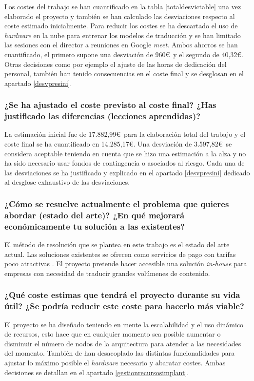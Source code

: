 Los costes del trabajo se han cuantificado en la tabla \ref{totaldesvictable} una vez elaborado el proyecto y también se han calculado las desviaciones respecto al coste estimado inicialmente. Para reducir los costes se ha descartado el uso de \textit{hardware} en la nube para entrenar los modelos de traducción y se han limitado las sesiones con el director a reuniones en Google \textit{meet}. Ambos ahorros se han cuantificado, el primero supone una desviación de 960\euro\ y el segundo de 40,32\euro. Otras decisiones como por ejemplo el ajuste de las horas de dedicación del personal, también han tenido consecuencias en el coste final y se desglosan en el apartado \ref{desvpresini}.

\subsubsection{¿Se ha ajustado el coste previsto al coste final? ¿Has justificado las diferencias (lecciones aprendidas)?}
La estimación inicial fue de 17.882,99\euro\ para la elaboración total del trabajo y el coste final se ha cuantificado en 14.285,17\euro. Una desviación de 3.597,82\euro\ se considera aceptable teniendo en cuenta que se hizo una estimación a la alza y no ha sido necesario usar fondos de contingencia o asociados al riesgo. Cada una de las desviaciones se ha justificado y explicado en el apartado \ref{desvpresini} dedicado al desglose exhaustivo de las desviaciones.

\subsubsection{¿Cómo se resuelve actualmente el problema que quieres abordar (estado del arte)?
¿En qué mejorará económicamente tu solución a las existentes?}

El método de resolución que se plantea en este trabajo es el estado del arte actual.
Las soluciones existentes se ofrecen como servicios de pago con tarifas poco atractivas
\cite{GoogleTranslatePricing,AWSTranslatePricing,MicrosoftTranslatePricing}. El proyecto pretende
hacer accesible una solución \textit{in-house} para empresas con necesidad de traducir grandes
volúmenes de contenido.

\subsubsection{¿Qué coste estimas que tendrá el proyecto durante su vida útil? ¿Se podría reducir este coste para hacerlo más viable?}
El proyecto se ha diseñado teniendo en mente la escalabilidad y el uso dinámico de recursos, esto hace que en cualquier momento sea posible aumentar o disminuir el número de nodos de la arquitectura para atender a las necesidades del momento. También de han desacoplado las distintas funcionalidades para ajustar lo máximo posible el \textit{hardware} necesario y abaratar costes. Ambas decisiones se detallan en el apartado \ref{gestionrecursosimplant}.

